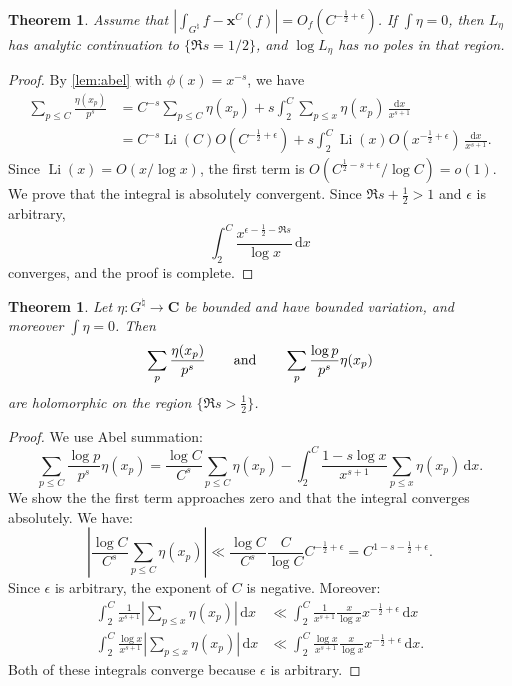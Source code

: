 \documentclass{article}
\DeclareMathOperator{\Li}{Li}
\newcommand{\bC}{\mathbf{C}}
\newcommand{\bx}{\boldsymbol{x}}
\newcommand{\dd}{\mathrm{d}}
\newtheorem{theorem}[subsection]{Theorem}
\theoremstyle{definition}
\begin{document}
\begin{theorem}
Assume that $\left|\int_{G^\natural} f - \bx^C(f)\right| = O_f(C^{-\frac 1 2+\epsilon})$. 
If $\int \eta = 0$, then $L_\eta$ has analytic continuation to $\{\Re s=1/2\}$, and 
$\log L_\eta$ has no poles in that region. 

\end{theorem}
\begin{proof}
By \autoref{lem:abel} with $\phi(x)=x^{-s}$, we have 
\begin{align*}
	\sum_{p\leqslant C} \frac{\eta(x_p)}{p^s} 
		&= C^{-s} \sum_{p\leqslant C} \eta(x_p) + s \int_2^C \sum_{p\leqslant x} \eta(x_p)\, \frac{\dd x}{x^{s+1}} \\
		&= C^{-s}\Li(C) O(C^{-\frac 1 2+\epsilon}) + s \int_2^C \Li(x) O(x^{-\frac 1 2+\epsilon})\, \frac{\dd x}{x^{s+1}} .
\end{align*}
Since $\Li(x)=O(x/\log x)$, the first term is 
$O(C^{\frac 1 2 -s+\epsilon}/\log C) = o(1)$. We prove that the integral is 
absolutely convergent. Since $\Re s+\frac 1 2>1$ and $\epsilon$ is arbitrary, 
\[
	\int_2^C \frac{x^{\epsilon-\frac 1 2-\Re s}}{\log x}\, \dd x
\]
converges, and the proof is complete. 
\end{proof}





\begin{theorem}
Let $\eta\colon G^\natural\to \bC$ be bounded and have bounded variation, and 
moreover $\int \eta = 0$. Then 
\[
	\sum_p\frac{\eta(x_p)}{p^s}
	\qquad \textnormal{and}\qquad
	\sum_p \frac{\log p}{p^s} \eta(x_p)
\]
are holomorphic on the region $\{\Re s>\frac 1 2\}$. 
\end{theorem}
\begin{proof}
We use Abel summation:
\[
	\sum_{p\leqslant C} \frac{\log p}{p^s} \eta(x_p) 
		= \frac{\log C}{C^s} \sum_{p\leqslant C} \eta(x_p) - \int_2^C \frac{1-s\log x}{x^{s+1}} \sum_{p\leqslant x} \eta(x_p)\, \dd x .
\]
We show the the first term approaches zero and that the integral converges 
absolutely. We have:
\[
	\left|\frac{\log C}{C^s} \sum_{p\leqslant C} \eta(x_p)\right| \ll \frac{\log C}{C^s} \frac{C}{\log C} C^{-\frac 1 2+\epsilon} = C^{1-s-\frac 1 2+\epsilon} .
\]
Since $\epsilon$ is arbitrary, the exponent of $C$ is negative. Moreover:
\begin{align*}
	\int_2^C \frac{1}{x^{s+1}} \left|\sum_{p\leqslant x} \eta(x_p)\right|\, \dd x 
		&\ll \int_2^C \frac{1}{x^{s+1}} \frac{x}{\log x} x^{-\frac 1 2 +\epsilon}\, \dd x \\
	\int_2^C \frac{\log x}{x^{s+1}} \left|\sum_{p\leqslant x} \eta(x_p)\right|\, \dd x 
		&\ll \int_2^C \frac{\log x}{x^{s+1}} \frac{x}{\log x} x^{-\frac 1 2 +\epsilon}\, \dd x .
\end{align*}
Both of these integrals converge because $\epsilon$ is arbitrary. 
\end{proof}
\end{document}
